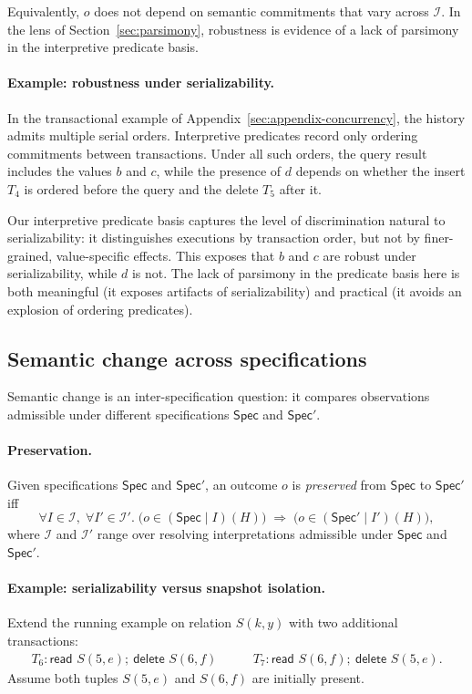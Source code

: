\documentclass[acmsmall,nonacm]{acmart}
\theoremstyle{remark}
\numberwithin{definition}{section}
\numberwithin{theorem}{section}
\numberwithin{lemma}{section}
\numberwithin{corollary}{section}
\numberwithin{remark}{section}
\numberwithin{example}{section}
\numberwithin{observation}{section}
\numberwithin{assumption}{section}
\newcommand{\Spec}{\mathsf{Spec}}
\begin{document}
Equivalently, $o$ does not depend on semantic commitments that vary across
$\mathcal{I}$.
In the lens of Section~\ref{sec:parsimony}, robustness is evidence of a lack of
parsimony in the interpretive predicate basis.

\paragraph{Example: robustness under serializability.}
In the transactional example of
Appendix~\ref{sec:appendix-concurrency}, the history admits multiple serial orders.
Interpretive predicates record only ordering commitments between transactions.
Under all such orders, the query result includes the values $b$ and $c$, while the
presence of $d$ depends on whether the insert $T_4$ is ordered before the query
and the delete $T_5$ after it.

Our interpretive predicate basis captures the level of discrimination natural to
serializability: it distinguishes executions by transaction order, but not by
finer-grained, value-specific effects.
This exposes that $b$ and $c$ are robust under serializability, while $d$ is not.
The lack of parsimony in the predicate basis here is both meaningful (it exposes artifacts of serializability)
and practical (it avoids an explosion of ordering predicates).

\subsection{Semantic change across specifications}
\label{sec:semantic-change}

Semantic change is an inter-specification question: it compares observations
admissible under different specifications $\Spec$ and $\Spec'$.

\paragraph{Preservation.}
Given specifications $\Spec$ and $\Spec'$, an outcome $o$ is \emph{preserved}
from $\Spec$ to $\Spec'$ iff
\[
  \forall I \in \mathcal{I},\; \forall I' \in \mathcal{I}'.\;
  \bigl(o \in (\Spec \mid I)(H)\bigr)
  \;\Rightarrow\;
  \bigl(o \in (\Spec' \mid I')(H)\bigr),
\]
where $\mathcal{I}$ and $\mathcal{I}'$ range over resolving interpretations
admissible under $\Spec$ and $\Spec'$.

\paragraph{Example: serializability versus snapshot isolation.}
Extend the running example on relation $S(k,y)$ with two additional transactions:
\[
\begin{array}{ll}
T_6: \textsf{read } S(5,e);\ \textsf{delete } S(6,f) \qquad &
T_7: \textsf{read } S(6,f);\ \textsf{delete } S(5,e).
\end{array}
\]
Assume both tuples $S(5,e)$ and $S(6,f)$ are initially present.
\end{document}
